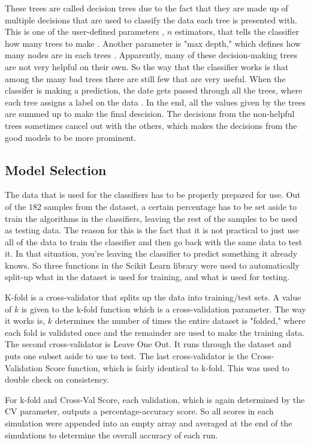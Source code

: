 \documentclass[conference,compsoc]{IEEEtran}
\begin{document}
These trees are called decision trees due to the fact that they are made up of multiple decisions that are used to classify the data each tree is presented with. This is one of the user-defined parameters , $n$ estimators, that tells the classifier how many trees to make \cite{scikit}. Another parameter is "max depth," which defines how many nodes are in each trees \cite{scikit}. Apparently, many of these decision-making trees are not very helpful on their own. So the way that the classifier works is that among the many bad trees there are still few that are very useful. When the classifer is making a prediction, the date gets passed through all the trees, where each tree assigns a label on the data \cite{random}. In the end, all the values given by the trees are summed up to make the final descision. The decisions from the non-helpful trees sometimes cancel out with the others, which makes the decisions from the good models to be more prominent.

\subsection{Model Selection}
The data that is used for the classifiers has to be properly prepared for use. Out of the $182$ samples from the dataset, a certain percentage has to be set aside to train the algorithms in the classifiers, leaving the rest of the samples to be used as testing data. The reason for this is the fact that it is not practical to just use all of the data to train the classifier and then go back with the same data to test it. In that situation, you're leaving the classifier to predict something it already knows. 
So three functions in the Scikit Learn library were used to automatically split-up what in the dataset is used for training, and what is used for testing. 

K-fold is a cross-validator that splits up the data into training/test sets. A value of $k$ is given to the k-fold function which is a cross-validation parameter. The way it works is, $k$ determines the number of times the entire dataset is "folded," where each fold is validated once and the remainder are used to make the training data. 
The second cross-validator is Leave One Out. It runs through the dataset and puts one subset aside to use to test. The last cross-validator is the Cross-Validation Score function, which is fairly identical to k-fold. This was used to double check on consistency.

For k-fold and Cross-Val Score, each validation, which is again determined by the CV parameter, outputs a percentage-accuracy score. So all scores in each simulation were appended into an empty array and averaged at the end of the simulations to determine the overall accuracy of each run.
\end{document}
